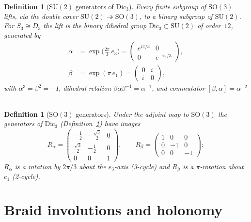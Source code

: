 \documentclass[12pt,a4paper]{report}
\newtheorem{definition}[theorem]{Definition}
\begin{document}
\begin{definition}[$\mathrm{SU}(2)$ generators of $\mathrm{Dic}_3$]
\label{def:su2-generators}
Every finite subgroup of $\mathrm{SO}(3)$ lifts, via the double cover
$\mathrm{SU}(2)\twoheadrightarrow\mathrm{SO}(3)$, to a binary subgroup of
$\mathrm{SU}(2)$.  For $S_3\cong D_3$ the lift is the binary dihedral group
$\mathrm{Dic}_3\subset\mathrm{SU}(2)$ of order~$12$, generated by
\begin{align}
  \alpha &= \exp\!\bigl(\tfrac{2\pi}{3}\,e_3\bigr)
  = \begin{pmatrix}e^{i\pi/3}&0\\[2pt]0&e^{-i\pi/3}\end{pmatrix},
  \label{eq:su2-3cycle}\\[4pt]
  \beta &= \exp(\pi\,e_1)
  = \begin{pmatrix}0&i\\[2pt]i&0\end{pmatrix},
  \label{eq:su2-2cycle}
\end{align}
with $\alpha^3=\beta^2=-I$, dihedral relation
$\beta\alpha\beta^{-1}=\alpha^{-1}$, and commutator
$[\beta,\alpha]=\alpha^{-2}$.
\end{definition}

\begin{definition}[$\mathrm{SO}(3)$ generators]
\label{def:so3-generators}
Under the adjoint map to $\mathrm{SO}(3)$ the generators of
$\mathrm{Dic}_3$ (Definition~\ref{def:su2-generators}) have images
\begin{equation}\label{eq:so3-generators}
  R_\alpha
  =\begin{pmatrix}
    -\frac{1}{2}&-\frac{\sqrt{3}}{2}&0\\[3pt]
    \frac{\sqrt{3}}{2}&-\frac{1}{2}&0\\[3pt]
    0&0&1
  \end{pmatrix},\qquad
  R_\beta
  =\begin{pmatrix}
    1&0&0\\[2pt]
    0&-1&0\\[2pt]
    0&0&-1
  \end{pmatrix}:
\end{equation}
$R_\alpha$ is a rotation by $2\pi/3$ about the $e_3$-axis (3-cycle) and
$R_\beta$ is a $\pi$-rotation about~$e_1$ (2-cycle).
\end{definition}



\section{Braid involutions and holonomy}
\label{sec:braid-involutions}
\end{document}
